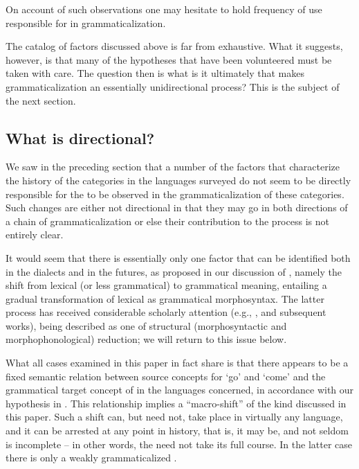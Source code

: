 \documentclass[output=paper]{langsci/langscibook}
\begin{document}
  On account of such observations one may hesitate to hold frequency of use responsible for  in grammaticalization.  



\newpage The catalog of factors discussed above is far from exhaustive. What it suggests, however, is that many of the hypotheses that have been volunteered must be taken with care. The question then is what is it ultimately that makes grammaticalization an essentially unidirectional process? This is the subject of the next section. 



\subsection{ What is directional?}\label{sec:heine:4.2}



We saw in the preceding section that a number of the factors that characterize the history of the  categories in the  languages surveyed do not seem to be directly responsible for the  to be observed in the grammaticalization of these categories. Such changes are either not directional in that they may go in both directions of a chain of grammaticalization or else their contribution to the process is not entirely clear. 



  It would seem that there is essentially only one factor that can be identified both in the  dialects and in the  futures, as proposed in our discussion of , namely the shift from lexical (or less grammatical) to grammatical meaning, entailing a gradual transformation of lexical as grammatical morphosyntax. The latter process has received considerable scholarly attention (e.g., \citealt{Lehmann2015Thoughts,HeineEtAl1991,BybeeEtAl1994}, and subsequent works), being described as one of structural (morphosyntactic and morphophonological) reduction; we will return to this issue below.



  What all cases examined in this paper in fact share is that there appears to be a fixed semantic relation between source concepts for `go' and `come' and the grammatical target concept of  in the languages concerned, in accordance with our hypothesis in . This relationship implies a ``macro-shift'' of the kind discussed in this paper. Such a shift can, but need not, take place in virtually any language, and it can be arrested at any point in history, that is, it may be, and not seldom is incomplete -- in other words, the  need not take its full course. In the latter case there is only a weakly grammaticalized .  
\end{document}
